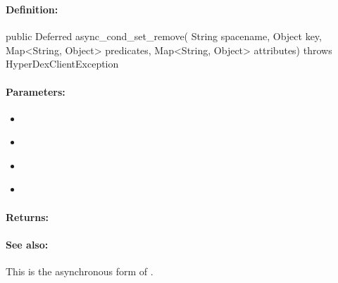\pagebreak
\subsubsection{}
\label{api:java:async_cond_set_remove}


\paragraph{Definition:}
\begin{javacode}
public Deferred async_cond_set_remove(
        String spacename,
        Object key,
        Map<String, Object> predicates,
        Map<String, Object> attributes) throws HyperDexClientException
\end{javacode}

\paragraph{Parameters:}
\begin{itemize}[noitemsep]
\item {}\\

\item {}\\

\item {}\\

\item {}\\

\end{itemize}

\paragraph{Returns:}


\paragraph{See also:}  This is the asynchronous form of .

\pagebreak
